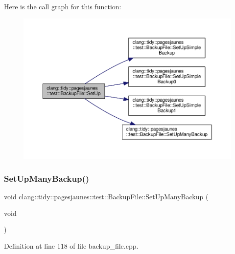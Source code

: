 Here is the call graph for this function\+:
\nopagebreak
\begin{figure}[H]
\begin{center}
\leavevmode
\includegraphics[width=350pt]{classclang_1_1tidy_1_1pagesjaunes_1_1test_1_1_backup_file_aad0e95d0c9bad2e2104fb6cb8ec7cacc_cgraph}
\end{center}
\end{figure}
\mbox{\label{classclang_1_1tidy_1_1pagesjaunes_1_1test_1_1_backup_file_a88f365e11813a35d63d07fcf832b3c85}} 
\subsubsection{\texorpdfstring{Set\+Up\+Many\+Backup()}{SetUpManyBackup()}}
{\footnotesize\ttfamily void clang\+::tidy\+::pagesjaunes\+::test\+::\+Backup\+File\+::\+Set\+Up\+Many\+Backup (\begin{DoxyParamCaption}\item[{void}]{ }\end{DoxyParamCaption})\hspace{0.3cm}{\ttfamily [virtual]}}



Definition at line 118 of file backup\+\_\+file.\+cpp.

